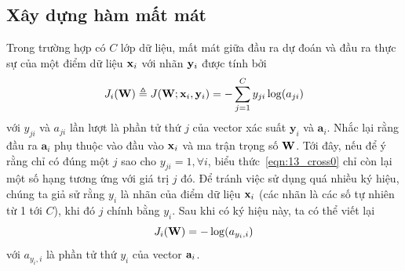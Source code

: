 \subsection{Xây dựng hàm mất mát}
Trong trường hợp có $C$ lớp dữ liệu, {mất mát} giữa
đầu ra dự đoán và đầu ra thực sự của một điểm dữ liệu $\mathbf{x}_i$ với
nhãn $\mathbf{y}_i$ được tính bởi
\begin{equation}
\label{eqn:13_cross0}
J_i(\mathbf{W}) \triangleq J(\mathbf{W};\mathbf{x}_i, \mathbf{y}_i) = -\sum_{j=1}^C
y_{ji}\log(a_{ji})
\end{equation}
với $y_{ji}$ và $ a_{ji}$ lần lượt là phần tử thứ $j$ của vector xác suất
$\mathbf{y}_i$ và $\mathbf{a}_i$. Nhắc lại rằng đầu ra $\mathbf{a}_i$ phụ thuộc vào đầu vào $\mathbf{x}_i$ và ma trận trọng số $\mathbf{W}$.
Tới đây, nếu để ý rằng chỉ có đúng một $j$ sao cho $y_{ji} = 1, \forall i$, biểu
thức~\eqref{eqn:13_cross0} chỉ còn lại một số hạng tương ứng với giá trị $j$ đó.
Để tránh việc sử dụng quá nhiều ký hiệu, chúng ta giả sử rằng $y_i$ là nhãn
của điểm dữ liệu $\mathbf{x}_i$ (các nhãn là các số tự nhiên từ 1 tới $C$), khi đó $j$
chính bằng $y_i$. Sau khi có
ký hiệu này, ta có thể viết lại
\begin{equation}
J_i(\mathbf{W}) = - \log(a_{y_i, i})
\end{equation}
với $a_{y_i, i}$ là phần tử thứ $y_i$ của vector $\mathbf{a}_i$.

